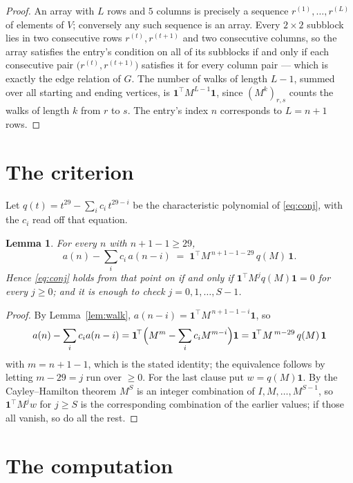 \documentclass[11pt,a4paper]{article}
\theoremstyle{plain}
\newtheorem{lemma}[theorem]{Lemma}
\theoremstyle{definition}
\begin{document}
\begin{proof}
An array with $L$ rows and $5$ columns is precisely a sequence
$r^{(1)},\dots,r^{(L)}$ of elements of $V$; conversely any such sequence is an array.
Every $2\times2$ subblock lies in two consecutive rows $r^{(t)},r^{(t+1)}$ and two
consecutive columns, so the array satisfies the entry's condition on all of its subblocks
if and only if each consecutive pair $\bigl(r^{(t)},r^{(t+1)}\bigr)$ satisfies it for
every column pair --- which is exactly the edge relation of $G$. The number of walks of
length $L-1$, summed over all starting and ending vertices, is
$\mathbf{1}^{\!\top}M^{L-1}\mathbf{1}$, since $(M^{k})_{r,s}$ counts the walks of
length $k$ from $r$ to $s$. The entry's index $n$ corresponds to $L=n+1$ rows.
\end{proof}

\section{The criterion}

Let $q(t)=t^{29}-\sum_i c_i\,t^{29-i}$ be the characteristic polynomial of
\eqref{eq:conj}, with the $c_i$ read off that equation.

\begin{lemma}\label{lem:crit}
For every $n$ with $n+1-1\ge29$,
\[
a(n)-\sum_i c_i\,a(n-i)\;=\;\mathbf{1}^{\!\top}M^{\,n+1-1-29}\,q(M)\,\mathbf{1} .
\]
Hence \eqref{eq:conj} holds from that point on if and only if
$\mathbf{1}^{\!\top}M^{j}q(M)\mathbf{1}=0$ for every $j\ge0$; and it is enough to check
$j=0,1,\dots,S-1$.
\end{lemma}

\begin{proof}
By Lemma~\ref{lem:walk}, $a(n-i)=\mathbf{1}^{\!\top}M^{\,n+1-1-i}\mathbf{1}$, so
\[
a(n)-\sum_i c_i a(n-i)
=\mathbf{1}^{\!\top}\Bigl(M^{m}-\sum_i c_i M^{m-i}\Bigr)\mathbf{1}
=\mathbf{1}^{\!\top}M^{\,m-29}\,q(M)\,\mathbf{1}
\]
with $m=n+1-1$, which is the stated identity; the equivalence follows by letting
$m-29=j$ run over $\ge0$. For the last clause put $w=q(M)\mathbf{1}$. By the
Cayley--Hamilton theorem $M^{S}$ is an integer combination of $I,M,\dots,M^{S-1}$, so
$\mathbf{1}^{\!\top}M^{j}w$ for $j\ge S$ is the corresponding combination of the earlier
values; if those all vanish, so do all the rest.
\end{proof}

\section{The computation}
\end{document}
